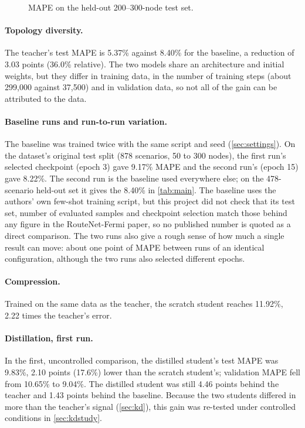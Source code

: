 \begin{figure}[ht]
\centering

\caption{MAPE on the held-out 200--300-node test set.}
\label{fig:ood-bar}
\end{figure}

\paragraph{Topology diversity.} The teacher's test MAPE is 5.37\% against 8.40\% for the baseline, a reduction of 3.03 points (36.0\% relative). The two models share an architecture and initial weights, but they differ in training data, in the number of training steps (about 299,000 against 37,500) and in validation data, so not all of the gain can be attributed to the data.

\paragraph{Baseline runs and run-to-run variation.} The baseline was trained twice with the same script and seed (\cref{sec:settings}). On the dataset's original test split (878 scenarios, 50 to 300 nodes), the first run's selected checkpoint (epoch 3) gave 9.17\% MAPE and the second run's (epoch 15) gave 8.22\%. The second run is the baseline used everywhere else; on the 478-scenario held-out set it gives the 8.40\% in \cref{tab:main}. The baseline uses the authors' own few-shot training script, but this project did not check that its test set, number of evaluated samples and checkpoint selection match those behind any figure in the RouteNet-Fermi paper, so no published number is quoted as a direct comparison. The two runs also give a rough sense of how much a single result can move: about one point of MAPE between runs of an identical configuration, although the two runs also selected different epochs.

\paragraph{Compression.} Trained on the same data as the teacher, the scratch student reaches 11.92\%, 2.22 times the teacher's error.

\paragraph{Distillation, first run.} In the first, uncontrolled comparison, the distilled student's test MAPE was 9.83\%, 2.10 points (17.6\%) lower than the scratch student's; validation MAPE fell from 10.65\% to 9.04\%. The distilled student was still 4.46 points behind the teacher and 1.43 points behind the baseline. Because the two students differed in more than the teacher's signal (\cref{sec:kd}), this gain was re-tested under controlled conditions in \cref{sec:kdstudy}.

